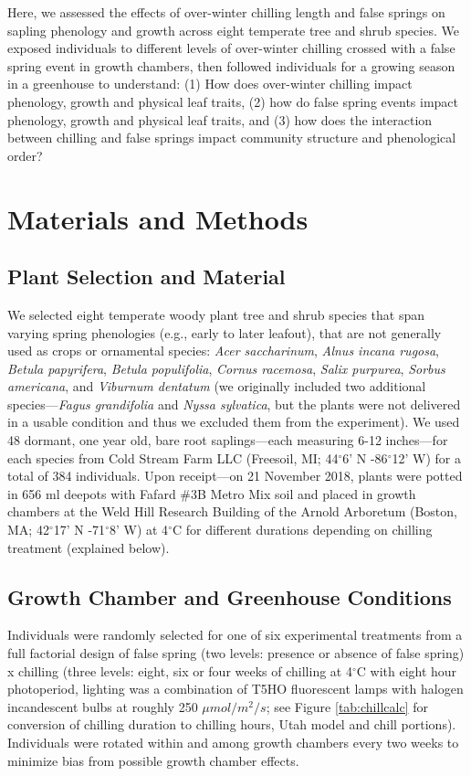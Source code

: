\documentclass{article}\usepackage[]{graphicx}\usepackage[]{color}
\begin{document}
Here, we assessed the effects of over-winter chilling length and false springs on sapling phenology and growth across eight temperate tree and shrub species. We exposed individuals to different levels of over-winter chilling crossed with a false spring event in growth chambers, then followed individuals for a growing season in a greenhouse to understand: (1) How does over-winter chilling impact phenology, growth and physical leaf traits, (2) how do false spring events impact phenology, growth and physical leaf traits, and (3) how does the interaction between chilling and false springs impact community structure and phenological order?

\section*{Materials and Methods} 
\subsection*{Plant Selection and Material}
We selected eight temperate woody plant tree and shrub species that span varying spring phenologies (e.g., early to later leafout), that are not generally used as crops or ornamental species: \textit{Acer saccharinum}, \textit{Alnus incana rugosa}, \textit{Betula papyrifera}, \textit{Betula populifolia}, \textit{Cornus racemosa}, \textit{Salix purpurea}, \textit{Sorbus americana}, and \textit{Viburnum dentatum} (we originally included two additional species---\textit{Fagus grandifolia} and \textit{Nyssa sylvatica}, but the plants were not delivered in a usable condition and thus we excluded them from the experiment). We used 48 dormant, one year old, bare root saplings---each measuring 6-12 inches---for each species from Cold Stream Farm LLC (Freesoil, MI; 44$^{\circ}$6' N -86$^{\circ}$12' W) for a total of 384 individuals. Upon receipt---on 21 November 2018, plants were potted in 656 ml deepots with Fafard \#3B Metro Mix soil and placed in growth chambers at the Weld Hill Research Building of the Arnold Arboretum (Boston, MA; 42$^{\circ}$17' N -71$^{\circ}$8' W) at 4$^{\circ}$C for different durations depending on chilling treatment (explained below).   

\subsection*{Growth Chamber and Greenhouse Conditions}
Individuals were randomly selected for one of six experimental treatments from a full factorial design of false spring (two levels: presence or absence of false spring) x chilling (three levels: eight, six or four weeks of chilling at 4$^{\circ}$C with eight hour photoperiod, lighting was a combination of T5HO fluorescent lamps with halogen incandescent bulbs at roughly 250 $\mu mol/m^{2}/s$; see Figure \ref{tab:chillcalc} for conversion of chilling duration to chilling hours, Utah model and chill portions). Individuals were rotated within and among growth chambers every two weeks to minimize bias from possible growth chamber effects. %
\end{document}
